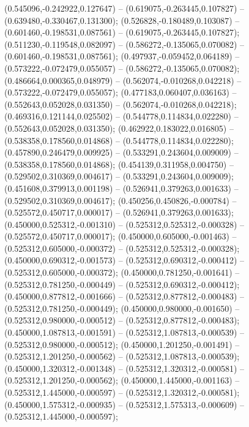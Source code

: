  (0.545096,-0.242922,0.127647) -- (0.619075,-0.263445,0.107827) -- (0.639480,-0.330467,0.131300);
 (0.526828,-0.180489,0.103087) -- (0.601460,-0.198531,0.087561) -- (0.619075,-0.263445,0.107827);
 (0.511230,-0.119548,0.082097) -- (0.586272,-0.135065,0.070082) -- (0.601460,-0.198531,0.087561);
 (0.497937,-0.059452,0.064189) -- (0.573222,-0.072479,0.055057) -- (0.586272,-0.135065,0.070082);
 (0.486664,0.000365,0.048979) -- (0.562074,-0.010268,0.042218) -- (0.573222,-0.072479,0.055057);
 (0.477183,0.060407,0.036163) -- (0.552643,0.052028,0.031350) -- (0.562074,-0.010268,0.042218);
 (0.469316,0.121144,0.025502) -- (0.544778,0.114834,0.022280) -- (0.552643,0.052028,0.031350);
 (0.462922,0.183022,0.016805) -- (0.538358,0.178560,0.014868) -- (0.544778,0.114834,0.022280);
 (0.457890,0.246479,0.009925) -- (0.533291,0.243604,0.009009) -- (0.538358,0.178560,0.014868);
 (0.454139,0.311958,0.004750) -- (0.529502,0.310369,0.004617) -- (0.533291,0.243604,0.009009);
 (0.451608,0.379913,0.001198) -- (0.526941,0.379263,0.001633) -- (0.529502,0.310369,0.004617);
 (0.450256,0.450826,-0.000784) -- (0.525572,0.450717,0.000017) -- (0.526941,0.379263,0.001633);
 (0.450000,0.525312,-0.001310) -- (0.525312,0.525312,-0.000328) -- (0.525572,0.450717,0.000017);
 (0.450000,0.605000,-0.001463) -- (0.525312,0.605000,-0.000372) -- (0.525312,0.525312,-0.000328);
 (0.450000,0.690312,-0.001573) -- (0.525312,0.690312,-0.000412) -- (0.525312,0.605000,-0.000372);
 (0.450000,0.781250,-0.001641) -- (0.525312,0.781250,-0.000449) -- (0.525312,0.690312,-0.000412);
 (0.450000,0.877812,-0.001666) -- (0.525312,0.877812,-0.000483) -- (0.525312,0.781250,-0.000449);
 (0.450000,0.980000,-0.001650) -- (0.525312,0.980000,-0.000512) -- (0.525312,0.877812,-0.000483);
 (0.450000,1.087813,-0.001591) -- (0.525312,1.087813,-0.000539) -- (0.525312,0.980000,-0.000512);
 (0.450000,1.201250,-0.001491) -- (0.525312,1.201250,-0.000562) -- (0.525312,1.087813,-0.000539);
 (0.450000,1.320312,-0.001348) -- (0.525312,1.320312,-0.000581) -- (0.525312,1.201250,-0.000562);
 (0.450000,1.445000,-0.001163) -- (0.525312,1.445000,-0.000597) -- (0.525312,1.320312,-0.000581);
 (0.450000,1.575312,-0.000935) -- (0.525312,1.575313,-0.000609) -- (0.525312,1.445000,-0.000597);
